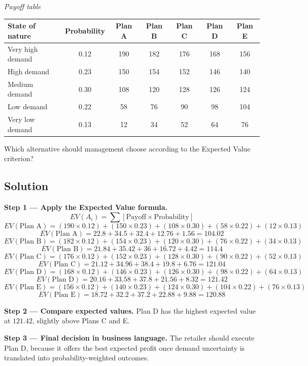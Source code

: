 \begin{ExamProblems}
		\begin{center}
			\textit{Payoff table} \par
			\begin{tabular}{l c c c c c c}
				\toprule
				State of nature & Probability & Plan A & Plan B & Plan C & Plan D & Plan E \\
				\midrule
				Very high demand & 0.12 & 190 & 182 & 176 & 168 & 156 \\
				High demand & 0.23 & 150 & 154 & 152 & 146 & 140 \\
				Medium demand & 0.30 & 108 & 120 & 128 & 126 & 124 \\
				Low demand & 0.22 & 58 & 76 & 90 & 98 & 104 \\
				Very low demand & 0.13 & 12 & 34 & 52 & 64 & 76 \\
				\bottomrule
			\end{tabular}
		\end{center}

		Which alternative should management choose according to the Expected Value criterion?

		\subsection*{Solution}
		\textbf{Step 1 --- Apply the Expected Value formula.}
		\[
		EV(A_i)=\sum [\text{Payoff}\times\text{Probability}]
		\]
		\[
		EV(\text{Plan A})=(190\times0.12)+(150\times0.23)+(108\times0.30)+(58\times0.22)+(12\times0.13)
		\]
		\[
		EV(\text{Plan A})=22.8+34.5+32.4+12.76+1.56=104.02
		\]
		\[
		EV(\text{Plan B})=(182\times0.12)+(154\times0.23)+(120\times0.30)+(76\times0.22)+(34\times0.13)
		\]
		\[
		EV(\text{Plan B})=21.84+35.42+36+16.72+4.42=114.4
		\]
		\[
		EV(\text{Plan C})=(176\times0.12)+(152\times0.23)+(128\times0.30)+(90\times0.22)+(52\times0.13)
		\]
		\[
		EV(\text{Plan C})=21.12+34.96+38.4+19.8+6.76=121.04
		\]
		\[
		EV(\text{Plan D})=(168\times0.12)+(146\times0.23)+(126\times0.30)+(98\times0.22)+(64\times0.13)
		\]
		\[
		EV(\text{Plan D})=20.16+33.58+37.8+21.56+8.32=121.42
		\]
		\[
		EV(\text{Plan E})=(156\times0.12)+(140\times0.23)+(124\times0.30)+(104\times0.22)+(76\times0.13)
		\]
		\[
		EV(\text{Plan E})=18.72+32.2+37.2+22.88+9.88=120.88
		\]
		
		\textbf{Step 2 --- Compare expected values.}
		Plan D has the highest expected value at $121.42$, slightly above Plans C and E.
		
		\textbf{Step 3 --- Final decision in business language.}
		The retailer should execute Plan D, because it offers the best expected profit once demand uncertainty is translated into probability-weighted outcomes.		\item

\end{ExamProblems}
